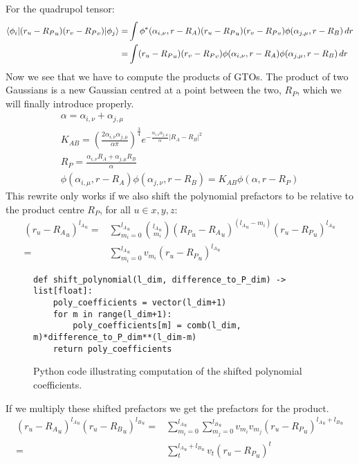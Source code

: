 For the quadrupol tensor:
\begin{align}
        \braket{\phi_i|(r_u-{R_P}_u)(r_v-{R_P}_v)|\phi_j} = &\int \phi^*(\alpha_{i,\nu},r-R_A)(r_u-{R_P}_u)(r_v-{R_P}_v)\phi(\alpha_{j,\mu},r-R_B)\,dr\\
        =&\int (r_u-{R_P}_u)(r_v-{R_P}_v)\phi(\alpha_{i,\nu},r-R_A)\phi(\alpha_{j,\mu},r-R_B)\,dr\notag
\end{align}
Now we see that we have to compute the products of GTOs. The product of two Gaussians is a new Gaussian centred at a point between the two, $R_P$, which we will finally introduce properly.
\begin{gather}
    \alpha = \alpha_{i,\nu}+\alpha_{j,\mu}\\
    K_{AB} = \left(\frac{2\alpha_{i,\nu}\alpha_{j,\mu}}{\alpha\pi}\right)^\frac{3}{4}e^{-\frac{\alpha_{i,\nu}\alpha_{j,\mu}}{\alpha}|R_A-R_B|^2}\\
    R_P = \frac{\alpha_{i,\nu}R_A+\alpha_{j,\mu}R_B}{\alpha}\\
    \phi(\alpha_{i,\mu},r-R_A)\phi(\alpha_{j,\nu},r-R_B) = K_{AB}\phi(\alpha,r-R_P)
\end{gather}
This rewrite only works if we also shift the polynomial prefactors to be relative to the product centre $R_P$, for all $u\in x,y,z$:
\begin{equation}
\begin{split}
    (r_u-{R_A}_u)^{{l_A}_u} = &\sum_{m_i=0}^{{l_A}_u}\binom{{l_A}_u}{m_i}({R_P}_u-{R_A}_u)^{({l_A}_u-m_i)}(r_u-{R_P}_u)^{{l_A}_u}\\
    =&\sum_{m_i=0}^{{l_A}_u}v_{m_i}(r_u-{R_P}_u)^{{l_A}_u}
\end{split}
\end{equation}
\begin{figure}[H]
\begin{verbatim}
def shift_polynomial(l_dim, difference_to_P_dim) -> list[float]:
    poly_coefficients = vector(l_dim+1)
    for m in range(l_dim+1):
        poly_coefficients[m] = comb(l_dim, m)*difference_to_P_dim**(l_dim-m)
    return poly_coefficients
\end{verbatim}
    \caption{Python code illustrating computation of the shifted polynomial coefficients.}
\end{figure}
If we multiply these shifted prefactors we get the prefactors for the product. 
\begin{equation}
\begin{split}
    (r_u-{R_A}_u)^{{l_A}_u}(r_u-{R_B}_u)^{{l_B}_u} = &\sum_{m_i=0}^{{l_A}_u}\sum_{m_j=0}^{{l_B}_u}v_{m_i}v_{m_j}(r_u-{R_P}_u)^{{l_A}_u+{l_B}_u}\\
    =&\sum_t^{{l_A}_u+{l_B}_u}v_t(r_u-{R_P}_u)^t
\end{split}
\end{equation}

